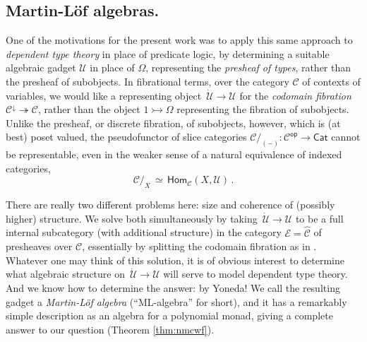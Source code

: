 \documentclass[12pt,reqno]{amsart}
\newcommand{\CC}{\ensuremath{\mathcal{C}}}
\newcommand{\EE}{\ensuremath{\mathcal{E}}}
\newcommand{\op}[1]{\ensuremath{{#1}^{\mathsf{op}}}}
\newcommand{\Hom}{\ensuremath{\mathsf{Hom}}}
\newcommand{\mono}{\ensuremath{\rightarrowtail}}
\renewcommand{\epi}{\ensuremath{\twoheadrightarrow}}
\renewcommand{\to}{\ensuremath{\rightarrow}}
\newcommand{\U}{\ensuremath{\mathcal{U}}}
\newcommand{\UU}{\ensuremath{\,\dot{\mathcal{U}}}}
\theoremstyle{remark}
\theoremstyle{definition}
\begin{document}
\subsection*{Martin-L\"of algebras.} One of the motivations for the present work was to apply this same approach to \emph{dependent type theory} in place of predicate logic, by determining a suitable algebraic gadget $\U$ in place of $\Omega$, representing the \emph{presheaf of types}, rather than the presheaf of subobjects.  In fibrational terms, over the category $\CC$ of contexts of variables, we would like a representing object $\UU \to \U$ for the \emph{codomain fibration} $\CC^\downarrow \epi \CC$, rather than the object $1\mono \Omega$ representing the fibration of subobjects.  Unlike the presheaf, or discrete fibration, of subobjects, however, which is (at best) poset valued, the pseudofunctor of slice categories $\CC/_{\!(-)} : \op{\CC} \to \mathsf{Cat}$ cannot be representable, even in the weaker sense of a natural equivalence of indexed categories,
\[
\CC/_{X}\, \simeq\, \Hom_{\CC}(X, \U)\,.
\]

There are really two different problems here: size and coherence of (possibly higher) structure.  We solve both simultaneously by taking $\UU \to \U$ to be a full internal subcategory (with additional structure) in the category $\EE = \widehat{\CC}$ of presheaves over $\CC$, essentially by splitting the codomain fibration as in \cite{Lums-Warren}.  Whatever one may think of this solution, it is of obvious interest to determine what algebraic structure on $\UU \to \U$ will serve to model dependent type theory. And we know how to determine the answer: by Yoneda!  We call the resulting gadget a \emph{Martin-L\"of algebra} (``ML-algebra'' for short), and it has a remarkably simple description as an algebra for a polynomial monad, giving a complete answer to our question (Theorem \ref{thm:nmcwf}).
\end{document}
